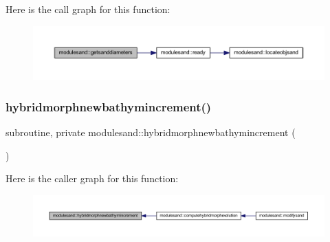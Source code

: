 Here is the call graph for this function\+:\nopagebreak
\begin{figure}[H]
\begin{center}
\leavevmode
\includegraphics[width=350pt]{namespacemodulesand_a622d6481ea9786885f9078db350e31ca_cgraph}
\end{center}
\end{figure}
\mbox{\label{namespacemodulesand_a16ec0bd3dc1304583be21920d21c0a74}} 
\subsubsection{\texorpdfstring{hybridmorphnewbathymincrement()}{hybridmorphnewbathymincrement()}}
{\footnotesize\ttfamily subroutine, private modulesand\+::hybridmorphnewbathymincrement (\begin{DoxyParamCaption}{ }\end{DoxyParamCaption})\hspace{0.3cm}{\ttfamily [private]}}

Here is the caller graph for this function\+:\nopagebreak
\begin{figure}[H]
\begin{center}
\leavevmode
\includegraphics[width=350pt]{namespacemodulesand_a16ec0bd3dc1304583be21920d21c0a74_icgraph}
\end{center}
\end{figure}
\mbox{\label{namespacemodulesand_abe7195f0a91ff792f6a36bea021901b1}} 
